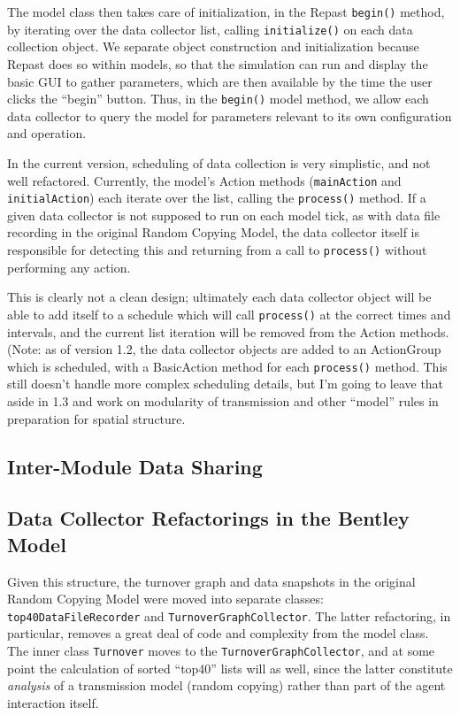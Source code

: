 \documentclass{kluwer-mem-copyright}
\begin{document}
\begin{article}
The model class then takes care of initialization, in the Repast
 \texttt{begin()} method, by iterating over the data collector list, calling
\texttt{initialize()} on each data collection object.  We separate object
construction and initialization because Repast does so within models, so that
the simulation can run and display the basic GUI to gather parameters,
which are then available by the time the user clicks the ``begin'' button. 
Thus, in the \texttt{begin()} model method, we allow each data collector to
query the model for parameters relevant to its own configuration and operation.

In the current version, scheduling of data collection is very simplistic, and
not well refactored.  Currently, the model's Action methods (\texttt{mainAction}
and \texttt{initialAction}) each iterate over the list, calling the
\texttt{process()} method.  If a given data collector is not supposed to run on
each model tick, as with data file recording in the original Random Copying
Model, the data collector itself is responsible for detecting this and returning
from a call to \texttt{process()} without performing any action.  

This is clearly not a clean design; ultimately each data collector object will
be able to add itself to a schedule which will call \texttt{process()} at the
correct times and intervals, and the current list iteration will be removed from
the Action methods. (Note:  as of version 1.2, the data collector objects are
added to an ActionGroup which is scheduled, with a BasicAction method for each
\texttt{process()} method.  This still doesn't handle more complex scheduling
details, but I'm going to leave that aside in 1.3 and work on modularity of 
transmission and other ``model'' rules in preparation for spatial structure.  

\subsection{Inter-Module Data Sharing}


\subsection{Data Collector Refactorings in the Bentley Model}
Given this structure, the turnover graph and data snapshots in the original
Random
Copying Model were moved into separate classes:\\  \texttt{top40DataFileRecorder}
and \texttt{TurnoverGraphCollector}.  The latter refactoring, in particular,
removes a great deal of code and complexity from the model class. 
The inner class \texttt{Turnover} moves to the \texttt{TurnoverGraphCollector},
and at some point the calculation of sorted ``top40'' lists will as well, since
the latter constitute \emph{analysis} of a transmission model (random copying)
rather than part of the agent interaction itself.


\end{article}
\end{document}
